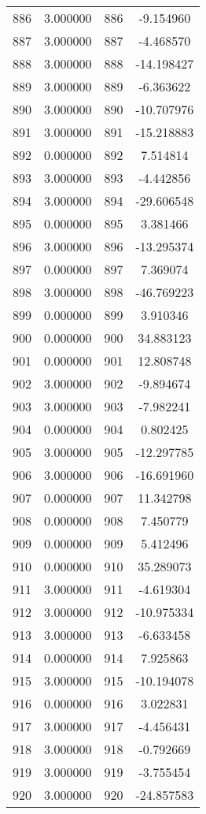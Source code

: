 \documentclass[12pt]{article}
\begin{document}
\begin{longtable}{@{}cccc@{}}
886 & 3.000000 & 886 & -9.154960 \\
887 & 3.000000 & 887 & -4.468570 \\
888 & 3.000000 & 888 & -14.198427 \\
889 & 3.000000 & 889 & -6.363622 \\
890 & 3.000000 & 890 & -10.707976 \\
891 & 3.000000 & 891 & -15.218883 \\
892 & 0.000000 & 892 & 7.514814 \\
893 & 3.000000 & 893 & -4.442856 \\
894 & 3.000000 & 894 & -29.606548 \\
895 & 0.000000 & 895 & 3.381466 \\
896 & 3.000000 & 896 & -13.295374 \\
897 & 0.000000 & 897 & 7.369074 \\
898 & 3.000000 & 898 & -46.769223 \\
899 & 0.000000 & 899 & 3.910346 \\
900 & 0.000000 & 900 & 34.883123 \\
901 & 0.000000 & 901 & 12.808748 \\
902 & 3.000000 & 902 & -9.894674 \\
903 & 3.000000 & 903 & -7.982241 \\
904 & 0.000000 & 904 & 0.802425 \\
905 & 3.000000 & 905 & -12.297785 \\
906 & 3.000000 & 906 & -16.691960 \\
907 & 0.000000 & 907 & 11.342798 \\
908 & 0.000000 & 908 & 7.450779 \\
909 & 0.000000 & 909 & 5.412496 \\
910 & 0.000000 & 910 & 35.289073 \\
911 & 3.000000 & 911 & -4.619304 \\
912 & 3.000000 & 912 & -10.975334 \\
913 & 3.000000 & 913 & -6.633458 \\
914 & 0.000000 & 914 & 7.925863 \\
915 & 3.000000 & 915 & -10.194078 \\
916 & 0.000000 & 916 & 3.022831 \\
917 & 3.000000 & 917 & -4.456431 \\
918 & 3.000000 & 918 & -0.792669 \\
919 & 3.000000 & 919 & -3.755454 \\
920 & 3.000000 & 920 & -24.857583 \\

\end{longtable}
\end{document}
